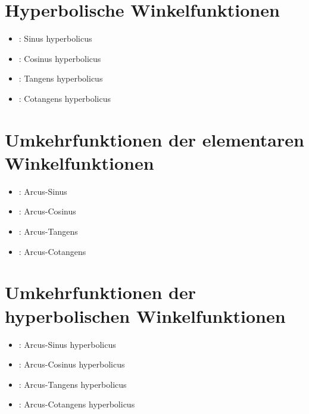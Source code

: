 \section{Hyperbolische Winkelfunktionen}

\begin{itemize}

\item
{}:
Sinus hyperbolicus

\item
{}:
Cosinus hyperbolicus

\item
{}:
Tangens hyperbolicus

\item
{}:
Cotangens hyperbolicus

\end{itemize}



\section{Umkehrfunktionen der elementaren Winkelfunktionen}

\begin{itemize}

\item
{}:
Arcus-Sinus

\item
{}:
Arcus-Cosinus

\item
{}:
Arcus-Tangens

\item
{}:
Arcus-Cotangens

\end{itemize}



\section{Umkehrfunktionen der hyperbolischen Winkelfunktionen}

\begin{itemize}

\item
{}:
Arcus-Sinus hyperbolicus

\item
{}:
Arcus-Cosinus hyperbolicus

\item
{}:
Arcus-Tangens hyperbolicus

\item
{}:
Arcus-Cotangens hyperbolicus

\end{itemize}



